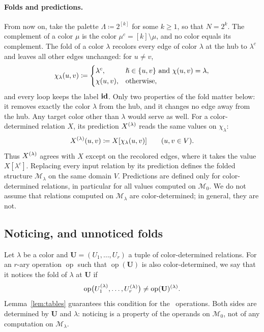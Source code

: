 \paragraph{Folds and predictions.}
From now on, take the palette $\Lambda\coloneqq2^{[k]}$ for some $k\ge1$, so that
$N=2^k$. The complement of a color $\mu$ is the color
$\mu^c=[k]\setminus\mu$, and no color equals its complement. The fold of
a color $\lambda$ recolors every edge of color $\lambda$ at the hub to
$\lambda^c$ and leaves all other edges unchanged: for $u\ne v$,
\[
 \chi_\lambda(u,v)\coloneqq
 \begin{cases}\lambda^c,&\hslash\in\{u,v\}\text{ and }\chi(u,v)=\lambda,\\
 \chi(u,v),&\text{otherwise},
 \end{cases}
\]
and every loop keeps the label $\mathbf{id}$. Only two properties of the fold
matter below: it removes exactly the color $\lambda$ from the hub, and
it changes no edge away from the hub. Any target color other than
$\lambda$ would serve as well. For a color-determined relation $X$,
its prediction $X^{(\lambda)}$ reads the same values on $\chi_\lambda$:
\[
 X^{(\lambda)}(u,v)\coloneqq X[\chi_\lambda(u,v)]\qquad(u,v\in V).
\]
Thus $X^{(\lambda)}$ agrees with $X$ except on the recolored edges,
where it takes the value $X[\lambda^c]$. Replacing every input relation
by its prediction defines the folded structure $\mathcal M_\lambda$ on
the same domain $V$. Predictions are defined only for color-determined relations, in
particular for all values computed on $\mathcal M_0$. We do not assume
that relations computed on $\mathcal M_\lambda$ are color-determined;
in general, they are not.

\subsection{Noticing, and unnoticed folds}\label{sec:unnoticed}
Let $\lambda$ be a color and $\mathbf U=(U_1,\ldots,U_r)$ a tuple of
color-determined relations. For an $r$-ary operation $\operatorname{op}$
such that $\operatorname{op}(\mathbf U)$ is also color-determined, we say
that it notices the fold of $\lambda$ at $\mathbf U$ if
\[
 \operatorname{op}\bigl(U_1^{(\lambda)},\ldots,U_r^{(\lambda)}\bigr)\ne
 \operatorname{op}(\mathbf U)^{(\lambda)}.
\]
Lemma~\ref{lem:tables} guarantees this condition for the \CoR\ operations.
Both sides are determined by $\mathbf U$ and $\lambda$: noticing is a
property of the operands on $\mathcal M_0$, not of any computation on
$\mathcal M_\lambda$.

